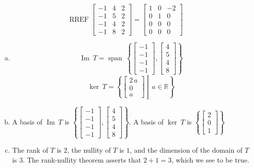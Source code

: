 \begin{exerciseAnswer} 


\[\operatorname{RREF} \left[\begin{array}{ccc}
-1 & 4 & 2 \\
-1 & 5 & 2 \\
-1 & 4 & 2 \\
-1 & 8 & 2
\end{array}\right] = \left[\begin{array}{ccc}
1 & 0 & -2 \\
0 & 1 & 0 \\
0 & 0 & 0 \\
0 & 0 & 0
\end{array}\right] \]


\begin{enumerate}[(a)]
\item \[\operatorname{Im}\ T = \operatorname{span}\  \left\{ \left[\begin{array}{c}
-1 \\
-1 \\
-1 \\
-1
\end{array}\right] , \left[\begin{array}{c}
4 \\
5 \\
4 \\
8
\end{array}\right] \right\} \]\[\operatorname{ker}\ T =  \left\{ \left[\begin{array}{c}
2 \, a \\
0 \\
a
\end{array}\right] \middle|\,a\in\mathbb{R}\right\} \]
\item  A basis of \(\operatorname{Im}\ T\) is \( \left\{ \left[\begin{array}{c}
-1 \\
-1 \\
-1 \\
-1
\end{array}\right] , \left[\begin{array}{c}
4 \\
5 \\
4 \\
8
\end{array}\right] \right\} \). A basis of \(\operatorname{ker}\ T\) is \( \left\{ \left[\begin{array}{c}
2 \\
0 \\
1
\end{array}\right] \right\} \)
\item  The rank of \(T\) is \( 2 \), the nullity of \(T\) is \( 1 \), and the dimension of the domain of \(T\) is \( 3 \). The rank-nullity theorem asserts that \( 2 + 1 = 3 \), which we see to be true. 
\end{enumerate}
    
\end{exerciseAnswer}
    

